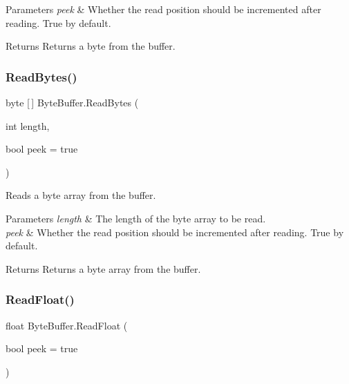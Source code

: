 \begin{DoxyParams}{Parameters}
{\em peek} & Whether the read position should be incremented after reading. True by default.\\
\hline
\end{DoxyParams}
\begin{DoxyReturn}{Returns}
Returns a byte from the buffer.
\end{DoxyReturn}
\mbox{\label{class_byte_buffer_ab43ff1cbc334a11dfbc59b7b57cfd551}} 
\subsubsection{\texorpdfstring{ReadBytes()}{ReadBytes()}}
{\footnotesize\ttfamily byte \mbox{[}$\,$\mbox{]} Byte\+Buffer.\+Read\+Bytes (\begin{DoxyParamCaption}\item[{int}]{length,  }\item[{bool}]{peek = {\ttfamily true} }\end{DoxyParamCaption})}



Reads a byte array from the buffer. 


\begin{DoxyParams}{Parameters}
{\em length} & The length of the byte array to be read.\\
\hline
{\em peek} & Whether the read position should be incremented after reading. True by default.\\
\hline
\end{DoxyParams}
\begin{DoxyReturn}{Returns}
Returns a byte array from the buffer.
\end{DoxyReturn}
\mbox{\label{class_byte_buffer_a52fda75f3b1d2203e9f3429b5c5e393d}} 
\subsubsection{\texorpdfstring{ReadFloat()}{ReadFloat()}}
{\footnotesize\ttfamily float Byte\+Buffer.\+Read\+Float (\begin{DoxyParamCaption}\item[{bool}]{peek = {\ttfamily true} }\end{DoxyParamCaption})}



